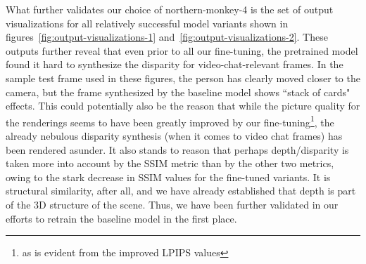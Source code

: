 What further validates our choice of northern-monkey-4 is the set of output visualizations for all relatively successful model variants shown in figures~\ref{fig:output-visualizations-1} and~\ref{fig:output-visualizations-2}. These outputs further reveal that even prior to all our fine-tuning, the pretrained model found it hard to synthesize the disparity for video-chat-relevant frames. In the sample test frame used in these figures, the person has clearly moved closer to the camera, but the frame synthesized by the baseline model shows ``stack of cards" effects. This could potentially also be the reason that while the picture quality for the renderings seems to have been greatly improved by our fine-tuning\footnote{as is evident from the improved LPIPS values}, the already nebulous disparity synthesis (when it comes to video chat frames) has been rendered asunder. It also stands to reason that perhaps depth/disparity is taken more into account by the SSIM metric than by the other two metrics, owing to the stark decrease in SSIM values for the fine-tuned variants. It is structural similarity, after all, and we have already established that depth is part of the 3D structure of the scene. Thus, we have been further validated in our efforts to retrain the baseline model in the first place.

